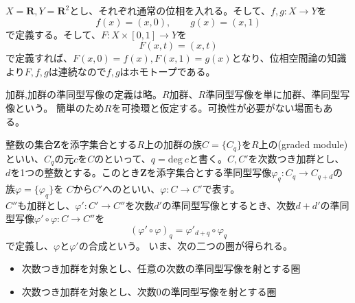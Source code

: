 \documentclass[dvipdfmx,a4paper,11pt]{jsarticle}
\begin{document}
\begin{tcolorbox}[title = ホモトープな例,colbacktitle = lime!80!black]
  $X=\mathbf{R},Y=\mathbf{R}^2$とし、それぞれ通常の位相を入れる。そして、$f,g:X\to Y$を
  \begin{equation*}
    f(x)=(x,0),\qquad g(x)=(x,1)
  \end{equation*}
  で定義する。そして、$F:X\times [0,1]\to Y$を
  \begin{equation*}
    F(x,t)=(x,t)
  \end{equation*}
  で定義すれば、$F(x,0)=f(x),F(x,1)=g(x)$となり、位相空間論の知識より$F,f,g$は連続なので$f,g$はホモトープである。
\end{tcolorbox}

加群,加群の準同型写像の定義は略。$R$加群、$R$準同型写像を単に加群、準同型写像という。
簡単のため$R$を可換環と仮定する。可換性が必要がない場面もある。
\begin{tcolorbox}[title = 例2]
  整数の集合$\mathbf{Z}$を添字集合とする$R$上の加群の族$C=\{C_{q}\}$を$R$上の(graded module)
  といい、$C_{q}$の元$c$を$C$のといって、$q=\text{deg}\ c$と書く。$C,C'$を次数つき加群とし、
  $d$を1つの整数とする。このとき$\mathbf{Z}$を添字集合とする準同型写像$\varphi_{q}:C_{q} \to C_{q+d}$の族$\varphi = \{\varphi_{q}\}$を
  $C$から$C'$へのといい、$\varphi : C\to C'$で表す。\\
  $C''$も加群とし、$\varphi' : C'\to C''$を次数$d'$の準同型写像とするとき、次数$d+d'$の準同型写像$\varphi' \circ \varphi : C\to C''$を
  \begin{equation*}
    (\varphi' \circ \varphi)_{q} = \varphi'_{d+q} \circ \varphi_{q}
  \end{equation*} 
  で定義し、$\varphi$と$\varphi'$の合成という。
  いま、次の二つの圏が得られる。
  \begin{itemize}
    \item 次数つき加群を対象とし、任意の次数の準同型写像を射とする圏
    \item 次数つき加群を対象とし、次数$0$の準同型写像を射とする圏
  \end{itemize}
\end{tcolorbox}
\end{document}

